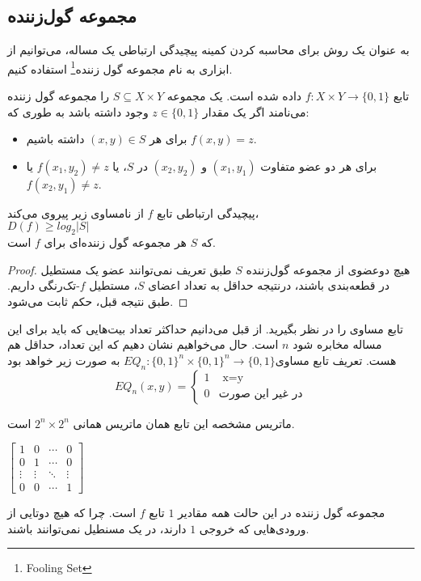 \subsection{مجموعه گول‌زننده}
به عنوان یک روش برای محاسبه کردن کمینه پیچیدگی ارتباطی یک مساله، می‌توانیم از ابزاری به نام مجموعه گول زننده\footnote{Fooling Set} استفاده کنیم.\\
\begin{definition}
تابع $f : X \times Y \rightarrow \{0,1\}$ داده شده است. یک مجموعه $S \subseteq X \times Y$ را مجموعه گول زننده می‌نامند اگر یک مقدار $z \in \{0,1\}$ وجود داشته باشد به طوری که:
\begin{itemize}
    \item برای هر $(x,y) \in S$ داشته باشیم $f(x,y) = z$.
    \item برای هر دو عضو متفاوت $(x_{1},y_{1})$ و $(x_{2},y_{2})$ در $S$، یا $f(x_{1}, y_{2}) \neq z$ یا $f(x_{2}, y_{1}) \neq z$.
\end{itemize}
\end{definition}
\begin{theorem}
 پیچیدگی ارتباطی تابع $f$ از نامساوی زیر پیروی می‌کند، \\
$D(f) \geq log_{2}|S|$\\
که $S$ هر مجموعه گول زننده‌ای برای $f$ است.
\end{theorem}
\begin{proof}
هیچ دوعضوی از مجموعه گول‌زننده $S$ طبق تعریف نمی‌توانند عضو یک مستطیل در قطعه‌بندی باشند، درنتیجه حداقل به تعداد اعضای $S$، مستطیل $f$-تک‌رنگی داریم. طبق نتیجه قبل، حکم ثابت می‌شود.

\end{proof}
\begin{example}
تابع مساوی را در نظر بگیرید. از قبل می‌دانیم حداکثر تعداد بیت‌هایی که باید برای این مساله مخابره شود $n$ است. حال می‌خواهیم نشان دهیم که این تعداد، حداقل هم هست. تعریف تابع مساوی$EQ_{n} : \{0,1\}^{n} \times \{0,1\}^{n} \rightarrow \{0,1\}$ به صورت زیر خواهد بود
\begin{equation}
    EQ_{n}(x,y) =
    \begin{cases}
        1 & \text{ x=y}\\
        0 & \text{در غیر این صورت}
    \end{cases}
\end{equation}

ماتریس مشخصه این تابع همان ماتریس همانی $2^{n} \times 2^{n}$ است.
\begin{center}
    $\begin{bmatrix}
         1 & 0 & \cdots & 0 \\
         0 & 1 & \cdots & 0 \\
         \vdots & \vdots & \ddots & \vdots \\
         0 & 0 & \cdots & 1
    \end{bmatrix}$
\end{center}
مجموعه گول زننده در این حالت همه مقادیر $1$ تابع $f$ است. چرا که هیچ دوتایی از ورودی‌هایی که خروجی $1$ دارند، در یک مسنطیل نمی‌توانند باشند.  \\
\end{example}
